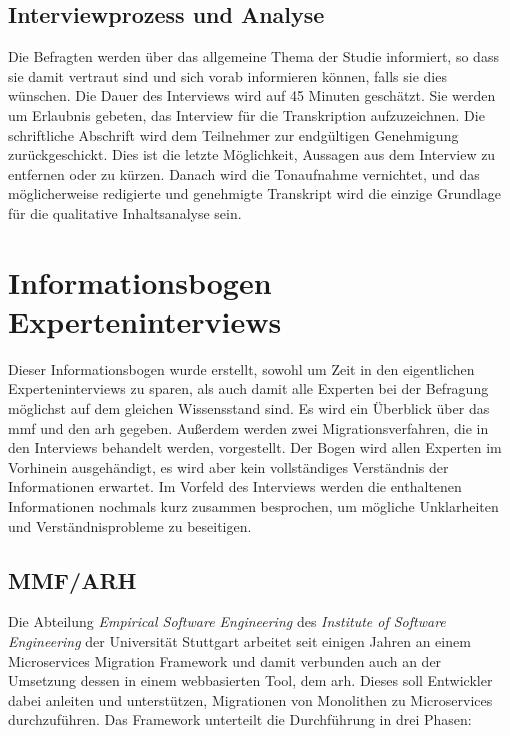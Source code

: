 \section{Interviewprozess und Analyse}
Die Befragten werden über das allgemeine Thema der Studie informiert, so dass sie damit vertraut sind und sich vorab informieren können, falls sie dies wünschen.
Die Dauer des Interviews wird auf 45 Minuten geschätzt.
Sie werden um Erlaubnis gebeten, das Interview für die Transkription aufzuzeichnen.
Die schriftliche Abschrift wird dem Teilnehmer zur endgültigen Genehmigung zurückgeschickt.
Dies ist die letzte Möglichkeit, Aussagen aus dem Interview zu entfernen oder zu kürzen.
Danach wird die Tonaufnahme vernichtet, und das möglicherweise redigierte und genehmigte Transkript wird die einzige Grundlage für die qualitative Inhaltsanalyse sein.

\chapter{Informationsbogen Experteninterviews}
\label{chap:expert-interviews-infobogen}

Dieser Informationsbogen wurde erstellt, sowohl um Zeit in den eigentlichen Experteninterviews zu sparen, als auch damit alle Experten bei der Befragung möglichst auf dem gleichen Wissensstand sind.
Es wird ein Überblick über das \acrfull{mmf} und den \acrfull{arh} gegeben.
Außerdem werden zwei Migrationsverfahren, die in den Interviews behandelt werden, vorgestellt.
Der Bogen wird allen Experten im Vorhinein ausgehändigt, es wird aber kein vollständiges Verständnis der Informationen erwartet.
Im Vorfeld des Interviews werden die enthaltenen Informationen nochmals kurz zusammen besprochen, um mögliche Unklarheiten und Verständnisprobleme zu beseitigen.

\section{MMF/ARH}

Die Abteilung \emph{Empirical Software Engineering} des \emph{Institute of Software Engineering} der Universität Stuttgart arbeitet seit einigen Jahren an einem Microservices Migration Framework und damit verbunden auch an der Umsetzung dessen in einem webbasierten Tool, dem \gls{arh}.
Dieses soll Entwickler dabei anleiten und unterstützen, Migrationen von Monolithen zu Microservices durchzuführen.
Das Framework unterteilt die Durchführung in drei Phasen:

